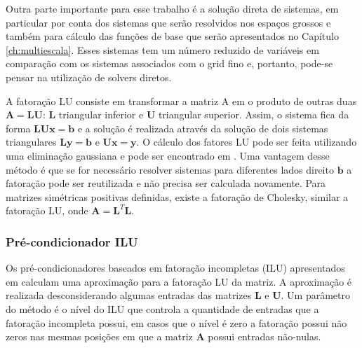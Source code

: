 Outra parte importante para esse trabalho é a solução direta de sistemas, em particular por conta dos sistemas que serão resolvidos nos espaços grossos e também para cálculo das funções de base que serão apresentados no Capítulo \ref{ch:multiescala}. Esses sistemas tem um número reduzido de variáveis em comparação com os sistemas associados com o grid fino e, portanto, pode-se pensar na utilização de solvers diretos.

A fatoração LU consiste em transformar a matriz A em o produto de outras duas $\mathbf{A}=\mathbf{L}\mathbf{U}$: $\mathbf{L}$ triangular inferior e $\mathbf{U}$ triangular superior. Assim, o sistema fica da forma $\mathbf{L} \mathbf{U} \mathbf{x} = \mathbf{b}$ e a solução é realizada através da solução de dois sistemas triangulares $\mathbf{L}\mathbf{y} = \mathbf{b}$ e $\mathbf{U}\mathbf{x} = \mathbf{y}$. O cálculo dos fatores LU pode ser feita utilizando uma eliminação gaussiana e pode ser encontrado em \citet{heath1997scientific}. Uma vantagem desse método é que se for necessário resolver sistemas para diferentes lados direito $\mathbf{b}$ a fatoração pode ser reutilizada e não precisa ser calculada novamente. Para matrizes simétricas positivas definidas, existe a fatoração de Cholesky, similar a fatoração LU, onde $\mathbf{A} = \mathbf{L}^T \mathbf{L}$.


\subsubsection{Pré-condicionador ILU}

Os pré-condicionadores baseados em fatoração incompletas (ILU) apresentados em \citet{ilupaper} calculam uma aproximação para a fatoração LU da matriz. A aproximação é realizada desconsiderando algumas entradas das matrizes $\mathbf{L}$ e $\mathbf{U}$. Um parâmetro do método é o nível do ILU que controla a quantidade de entradas que a fatoração incompleta possui, em casos que o nível é zero a fatoração possui não zeros nas mesmas posições em que a matriz $\mathbf{A}$ possui entradas não-nulas. 
